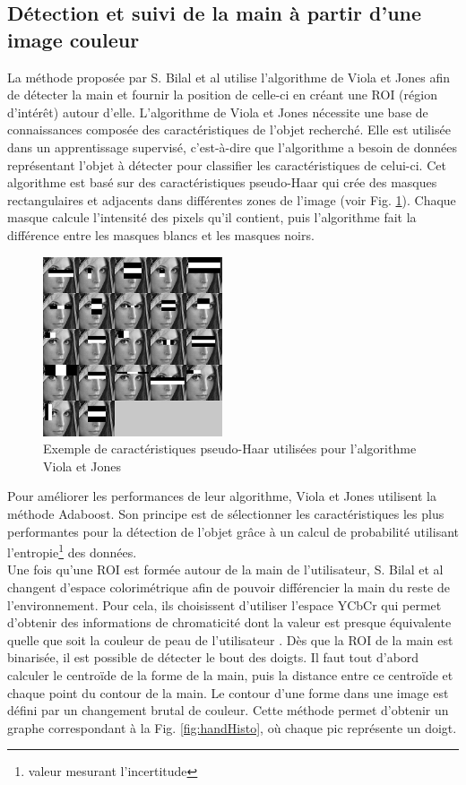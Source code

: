 \subsection{Détection et suivi de la main à partir d'une image couleur}
La méthode proposée par S. Bilal et al \cite{haarlike} utilise l'algorithme de Viola et Jones \cite{viola2001jones} afin
de détecter la main et fournir la position de celle-ci en créant une ROI (région d'intérêt) autour d'elle.
L'algorithme de Viola et Jones \cite{viola2001jones} nécessite une 
base de connaissances composée des caractéristiques de l'objet recherché. Elle est utilisée dans un 
apprentissage supervisé, c'est-à-dire que l'algorithme a besoin de données représentant
l'objet à détecter pour classifier les caractéristiques de celui-ci. Cet algorithme est basé sur des caractéristiques 
pseudo-Haar qui crée des masques rectangulaires et adjacents dans différentes zones de l'image (voir Fig. \ref{fig:pseudo_haar}). 
Chaque masque calcule l'intensité des pixels qu'il contient, puis l'algorithme fait la différence entre les masques blancs et 
les masques noirs.\\

\begin{figure}[!h]
\center
\includegraphics[width=200px]{images/pseudoHaar.jpg}
\caption{Exemple de caractéristiques pseudo-Haar utilisées pour l'algorithme Viola et Jones}
\label{fig:pseudo_haar}
\end{figure}

Pour améliorer les performances de leur algorithme, Viola et Jones utilisent la méthode Adaboost. Son
principe est de sélectionner les caractéristiques les plus performantes pour la détection de l'objet grâce à
un calcul de probabilité utilisant l'entropie\footnote{valeur mesurant l'incertitude} des données.\\

Une fois qu'une ROI est formée autour de la main de l'utilisateur, S. Bilal et al \cite{haarlike} changent d'espace colorimétrique
afin de pouvoir différencier la main du reste de l'environnement. Pour cela, ils choisissent 
d'utiliser l'espace YCbCr qui permet d'obtenir des informations de chromaticité dont la valeur est presque équivalente
quelle que soit la couleur de peau de l'utilisateur \cite{yoo1999fast}. Dès que la ROI de la main est binarisée, il est possible
de détecter le bout des doigts. Il faut tout d'abord calculer le centroïde de la forme de la main, puis la distance entre
ce centroïde et chaque point du contour de la main. Le contour d'une forme dans une image est défini par un changement brutal
de couleur. Cette méthode permet d'obtenir un graphe correspondant à la Fig. \ref{fig:handHisto}, où chaque pic représente un doigt.\\

